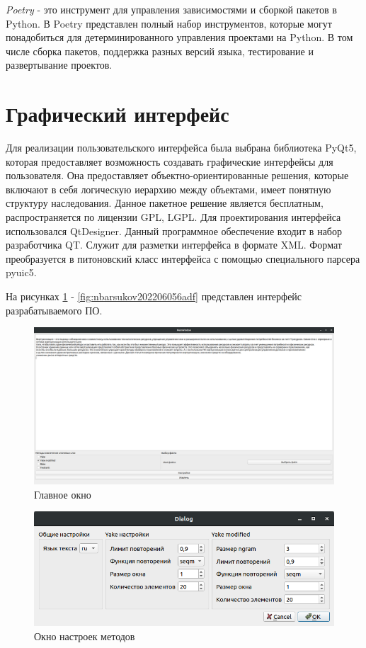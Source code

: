 \textit{Poetry} - это инструмент для управления зависимостями и сборкой пакетов в Python.
В Poetry представлен полный набор инструментов, которые могут понадобиться для детерминированного управления проектами на Python. В том числе сборка пакетов, поддержка разных версий языка, тестирование и развертывание проектов.

\section{Графический интерфейс}
Для реализации пользовательского интерфейса была выбрана библиотека PyQt5, которая предоставляет возможность создавать графические интерфейсы для пользователя. 
Она предоставляет объектно-ориентированные решения, которые включают в себя логическую иерархию между объектами, имеет понятную структуру наследования.
Данное пакетное решение является бесплатным, распространяется по лицензии GPL, LGPL.
Для проектирования интерфейса использовался QtDesigner.
Данный программное обеспечение  входит в набор разработчика QT.
Служит для разметки интерфейса в формате XML.
Формат преобразуется в питоновский класс интерфейса с помощью специального парсера pyuic5.

На рисунках \ref{fig:nbarsukov20220605a9ea} - \ref{fig:nbarsukov202206056adf} представлен интерфейс разрабатываемого ПО.

\begin{figure}[!h]
	\centering
	\includegraphics[width=0.7\linewidth]{src/img/tech/nbarsukov_20220605_a9ea}
	\caption{Главное окно}
	\label{fig:nbarsukov20220605a9ea}
\end{figure}


\begin{figure}[!h]
	\centering
	\includegraphics[width=0.7\linewidth]{src/img/programm/settings}
	\caption{Окно настроек методов}
	\label{fig:settings}
\end{figure}

